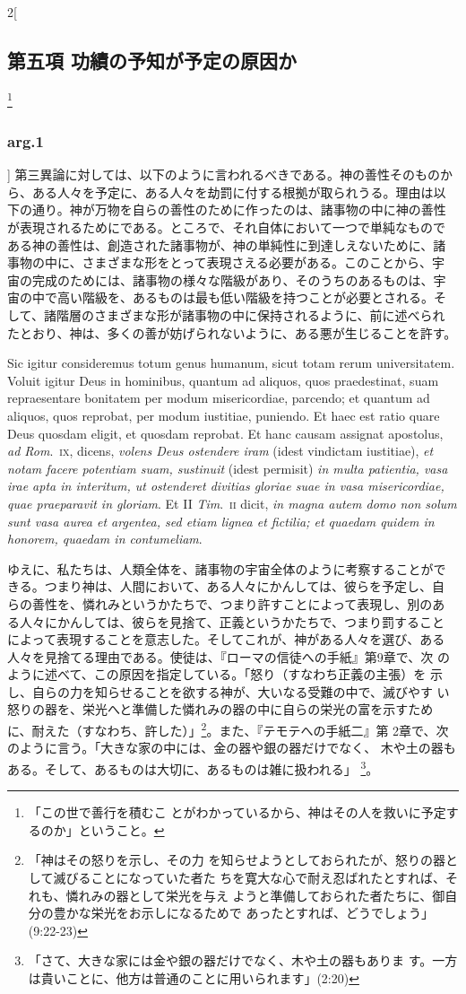 \documentclass[paper=a4paper,fontsize=10pt,jafontsize=9pt,titlepage]{jlreq}
\begin{document}
\begin{paracol}{2}[\subsection{第五項 功績の予知が予定の原因か}\footnote{「この世で善行を積むこ とがわかっているから、神はその人を救いに予定するのか」ということ。}\subsubsection{arg.1}]
第三異論に対しては、以下のように言われるべきである。神の善性そのものか
ら、ある人々を予定に、ある人々を劫罰に付する根拠が取られうる。理由は以
下の通り。神が万物を自らの善性のために作ったのは、諸事物の中に神の善性
が表現されるためにである。ところで、それ自体において一つで単純なもので
ある神の善性は、創造された諸事物が、神の単純性に到達しえないために、諸
事物の中に、さまざまな形をとって表現さえる必要がある。このことから、宇
宙の完成のためには、諸事物の様々な階級があり、そのうちのあるものは、宇
宙の中で高い階級を、あるものは最も低い階級を持つことが必要とされる。そ
して、諸階層のさまざまな形が諸事物の中に保持されるように、前に述べられ
たとおり、神は、多くの善が妨げられないように、ある悪が生じることを許す。


\switchcolumn*


Sic igitur consideremus totum genus humanum, sicut totam
rerum universitatem. Voluit igitur Deus in hominibus, quantum ad
aliquos, quos praedestinat, suam repraesentare bonitatem per modum
misericordiae, parcendo; et quantum ad aliquos, quos reprobat, per modum
iustitiae, puniendo. Et haec est ratio quare Deus quosdam eligit, et
quosdam reprobat. Et hanc causam assignat apostolus, {\itshape ad Rom}.~{\scshape ix}, dicens,
{\itshape volens Deus ostendere iram} (idest vindictam iustitiae), {\itshape et notam facere
potentiam suam, sustinuit} (idest permisit) {\itshape in multa patientia, vasa irae
apta in interitum, ut ostenderet divitias gloriae suae in vasa
misericordiae, quae praeparavit in gloriam}. Et II {\itshape Tim}.~{\scshape ii} dicit, {\itshape in
magna autem domo non solum sunt vasa aurea et argentea, sed etiam lignea
et fictilia; et quaedam quidem in honorem, quaedam in contumeliam}.


\switchcolumn


ゆえに、私たちは、人類全体を、諸事物の宇宙全体のように考察することがで
きる。つまり神は、人間において、ある人々にかんしては、彼らを予定し、自
らの善性を、憐れみというかたちで、つまり許すことによって表現し、別のあ
る人々にかんしては、彼らを見捨て、正義というかたちで、つまり罰すること
によって表現することを意志した。そしてこれが、神がある人々を選び、ある
人々を見捨てる理由である。使徒は、『ローマの信徒への手紙』第9章で、次
のように述べて、この原因を指定している。「怒り（すなわち正義の主張）を
示し、自らの力を知らせることを欲する神が、大いなる受難の中で、滅びやす
い怒りの器を、栄光へと準備した憐れみの器の中に自らの栄光の富を示すため
に、耐えた（すなわち、許した）」\footnote{「神はその怒りを示し、その力
を知らせようとしておられたが、怒りの器として滅びることになっていた者た
ちを寛大な心で耐え忍ばれたとすれば、それも、憐れみの器として栄光を与え
ようと準備しておられた者たちに、御自分の豊かな栄光をお示しになるためで
あったとすれば、どうでしょう」(9:22-23)}。また、『テモテへの手紙二』第
2章で、次のように言う。「大きな家の中には、金の器や銀の器だけでなく、
木や土の器もある。そして、あるものは大切に、あるものは雑に扱われる」
\footnote{「さて、大きな家には金や銀の器だけでなく、木や土の器もありま
す。一方は貴いことに、他方は普通のことに用いられます」(2:20)}。



\end{paracol}
\end{document}
